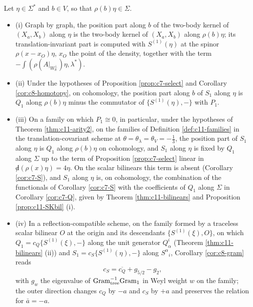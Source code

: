 \begin{proposition}
\label{prop:c11-S}
Let $\eta\in\Sigma^*$ and $b\in V$, so that $\rho(b)\eta\in\Sigma$.
\begin{itemize}
\item (i) Graph by graph, the position part along $b$ of the two-body kernel of $(X_a,X_b)$ along $\eta$ is the two-body kernel of $(X_a,X_b)$ along $\rho(b)\eta$; its translation-invariant part is computed with $S^{(1)}(\eta)$ at the spinor $\rho(x-x_O)\eta$, $x_O$ the point of the density, together with the term $-\int(\rho(A|_{W_{\mathbb R}^\perp})\eta,\lambda^*)$.
\item (ii) Under the hypotheses of Proposition \ref{prop:c7-select} and Corollary \ref{cor:c8-homotopy}, on cohomology, the position part along $b$ of $S_1$ along $\eta$ is $Q_1$ along $\rho(b)\eta$ minus the commutator of $\{S^{(1)}(\eta),-\}$ with $P_1$.
\item (iii) On a family on which $P_1\cong0$, in particular, under the hypotheses of Theorem \ref{thm:c11-arity2}, on the families of Definition \ref{def:c11-families} in the translation-covariant scheme at $\theta=\theta_\lambda=\theta_V=-\tfrac13$, the position part of $S_1$ along $\eta$ is $Q_1$ along $\rho(b)\eta$ on cohomology, and $S_1$ along $\eta$ is fixed by $Q_1$ along $\Sigma$ up to the term of Proposition \ref{prop:c7-select} linear in ${\not d}(\rho(x)\eta)=4\eta$. On the scalar bilinears this term is absent (Corollary \ref{cor:c7-S}), and $S_1$ along $\eta$ is, on cohomology, the combination of the functionals of Corollary \ref{cor:c7-S} with the coefficients of $Q_1$ along $\Sigma$ in Corollary \ref{cor:c7-Q}, given by Theorem \ref{thm:c11-bilinears} and Proposition \ref{prop:c11-SKbil} (i).
\item (iv) In a reflection-compatible scheme, on the family formed by a traceless scalar bilinear $O$ at the origin and its descendants $\{S^{(1)}(\xi),O\}$, on which $Q_1=c_Q\{S^{(1)}(\xi),-\}$ along the unit generator $Q^i_\alpha$ (Theorem \ref{thm:c11-bilinears} (ii)) and $S_1=c_S\{S^{(1)}(\eta),-\}$ along $S^\alpha{}_i$, Corollary \ref{cor:c8-gram} reads
\[
c_S=\overline{c_Q}+g_{5/2}-g_2,
\]
with $g_w$ the eigenvalue of $\mathrm{Gram}_{\rm tree}^{-1}\mathrm{Gram}_{\rm 1}$ in Weyl weight $w$ on the family; the outer direction changes $c_Q$ by $-a$ and $c_S$ by $+a$ and preserves the relation for $\bar a=-a$.
\end{itemize}
\end{proposition}

